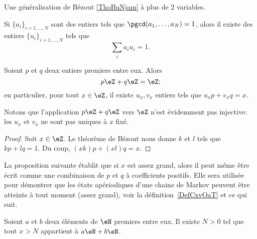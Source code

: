 Une généralisation de Bézout \ref{ThoBuNjam} à plus de \( 2\) variables.
\begin{proposition}     \label{PROPooWSMTooMdfqse}
    Si \( \{ a_i \}_{i=1,\ldots, N}\) sont des entiers tels que \( \pgcd(a_1,\ldots, a_N)=1\), alors il existe des entiers \( \{ u_i \}_{i=1,\ldots, N}\) tels que
    \begin{equation}
        \sum_ia_iu_i=1.
    \end{equation}
\end{proposition}

\begin{corollary}       \label{CorgEMtLj}
    Soient \( p\) et \( q\) deux entiers premiers entre eux. Alors
    \begin{equation}
        p\eZ+q\eZ=\eZ;
    \end{equation}
    en particulier, pour tout \( x \in \eZ \), il existe \( u_x, v_x \) entiers tels que \(u_x p + v_x q = x \).
\end{corollary}

Notons que l'application \( p\eZ+q\eZ\) vers \( \eZ\) n'est évidemment pas injective: les $u_x$ et $v_x$ ne sont pas uniques à $x$ fixé.

\begin{proof}
    Soit \( x\in \eZ\). Le théorème de Bézout nous donne \( k\) et \( l\) tels que \( kp+lq=1\). Du coup, \( (xk)p+(xl)q=x\).
\end{proof}

La proposition suivante établit que si \( x\) est assez grand, alors il peut même être écrit comme une combinaison de \( p\) et \( q\) à coefficients positifs. Elle sera utilisée pour démontrer que les états apériodiques d'une chaine de Markov peuvent être atteints à tout moment (assez grand), voir la définition~\ref{DefCxvOaT} et ce qui suit.

\begin{proposition}     \label{PropLAbRSE}
    Soient \( a\) et \( b\) deux éléments de \( \eN\) premiers entre eux. Il existe \( N>0\) tel que tout \( x>N\) appartient à \( a\eN+b\eN\).
\end{proposition}

